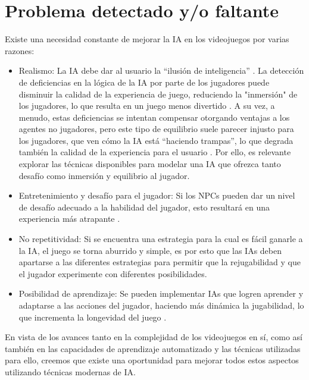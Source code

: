 \documentclass[a4paper]{article}
\begin{document}
\section{Problema detectado y/o faltante}

Existe una necesidad constante de mejorar la IA en los videojuegos por varias razones:

\begin{itemize}
    \item Realismo: La IA debe dar al usuario la “ilusión de inteligencia” \cite{programming_game_ai_by_example}\cite{unity_artificial_intelligence_programming}. La detección de deficiencias en la lógica de la IA por parte de los jugadores puede disminuir la calidad de la experiencia de juego, reduciendo la "inmersión" de los jugadores, lo que resulta en un juego menos divertido \cite{programming_game_ai_by_example}. A su vez,  a menudo, estas deficiencias se intentan compensar otorgando ventajas a los agentes no jugadores, pero este tipo de equilibrio suele parecer injusto para los jugadores, que ven cómo la IA está “haciendo trampas”, lo que degrada también la calidad de la experiencia para el usuario \cite{programming_game_ai_by_example}. Por ello, es relevante explorar las técnicas disponibles para modelar una IA que ofrezca tanto desafío como inmersión y equilibrio al jugador.
    \item Entretenimiento y desafío para el jugador: Si los NPCs pueden dar un nivel de desafío adecuado a la habilidad del jugador, esto resultará en una experiencia más atrapante \cite{artificial_intelligence_for_video_game_visualization}.
    \item No repetitividad:  Si se encuentra una estrategia para la cual es fácil ganarle a la IA, el juego se torna aburrido y simple, es por esto que las IAs deben apartarse a las diferentes estrategias para permitir que la rejugabilidad y que el jugador experimente con diferentes posibilidades.
    \item Posibilidad de aprendizaje: Se pueden implementar IAs que logren aprender y adaptarse a las acciones del jugador, haciendo más dinámica la jugabilidad, lo que incrementa la longevidad del juego \cite{an_adaptive_game_ai_architecture}\cite{artificial_intelligence_for_video_game_visualization}.
\end{itemize}

En vista de los avances tanto en la complejidad de los videojuegos en sí, como así también en las capacidades de aprendizaje automatizado y las técnicas utilizadas para ello, creemos que existe una oportunidad para mejorar todos estos aspectos utilizando técnicas modernas de IA.
\end{document}
